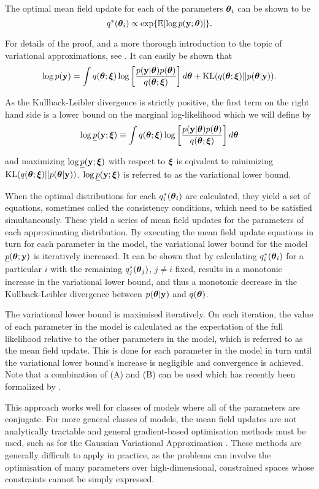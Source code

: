 The optimal mean field update for each of the parameters ${\boldsymbol \theta}_i$ can be
shown to be
$$
	q^*({\boldsymbol \theta}_i) \propto \exp \{ \mathbb{E} [\log p({\bf y}; {\boldsymbol \theta})] \}.
$$

\noindent For details of the proof, and a more thorough introduction to the
topic of variational approximations, see \cite{Ormerod2010}. It can easily be
shown that
$$
	\displaystyle \log p({\bf y}) = \int q({\boldsymbol \theta};{\boldsymbol \xi}) \log \left[ \frac{p({\bf y}|{\boldsymbol \theta})p({\boldsymbol \theta})}{q({\boldsymbol \theta};{\boldsymbol \xi})} \right] d{\boldsymbol \theta} + \text{KL}(q({\boldsymbol \theta};{\boldsymbol \xi})||p({\boldsymbol \theta}|{\bf y})).
$$

\noindent As the Kullback-Leibler divergence is strictly positive, the first
term on the right hand side is a lower bound on the marginal log-likelihood
which we will define by
$$
	\displaystyle \log \underline{p}({\bf y};{\boldsymbol \xi}) \equiv \int q({\boldsymbol \theta};{\boldsymbol \xi})  \log \left[ \frac{p({\bf y}|{\boldsymbol \theta})p({\boldsymbol \theta})}{q({\boldsymbol \theta};{\boldsymbol \xi})} \right] d{\boldsymbol \theta}
$$

\noindent and maximizing $\log \underline{p}({\bf y};{\boldsymbol \xi})$ with respect to ${\boldsymbol \xi}$
is eqivalent to minimizing $\text{KL}(q({\boldsymbol \theta};{\boldsymbol \xi})||p({\boldsymbol \theta}|{\bf y}))$. $\log
\underline{p}({\bf y};{\boldsymbol \xi})$ is referred to as the variational lower bound.

When the optimal distributions for each $q_i^*({\boldsymbol \theta}_i)$ are calculated, they
yield a set of equations, sometimes called the consistency conditions, which
need to be  satisfied simultaneously. These yield a series of mean field updates
for the parameters of each approximating distribution. By executing the mean
field update equations in turn for each parameter in the model, the variational
lower bound for the model $\underline{p}({\boldsymbol \theta}; {\bf y})$ is iteratively
increased. It can be shown that by calculating $q_i^*({\boldsymbol \theta}_i)$ for  a
particular $i$ with the remaining $q_j^*({\boldsymbol \theta}_j)$, $j\ne i$ fixed, results in
a monotonic increase in the variational lower bound, and thus a monotonic
decrease in the Kullback-Leibler divergence between $p({\boldsymbol \theta}|{\bf y})$ and
$q({\boldsymbol \theta})$.

The variational lower bound is maximised iteratively. On each iteration, the
value of each parameter in the model is calculated as the expectation of the
full likelihood relative to the other parameters in the model, which is referred
to as the mean field update. This is done for each parameter in the model in
turn until the variational lower bound's increase is negligible and convergence
is achieved. Note that a combination of (A) and (B) can be used which has
recently been formalized by \cite{Rohde2015}.

This approach works well for classes of models where all of the parameters are
conjugate. For more general classes of models, the mean field updates are not
analytically tractable and general gradient-based optimisation methods must be
used, such as for the Gaussian Variational Approximation \cite{Ormerod2012}.
These methods are generally difficult to apply in practice, as the problems can
involve the optimisation of many parameters over high-dimensional, constrained
spaces whose constraints cannot be simply expressed.

